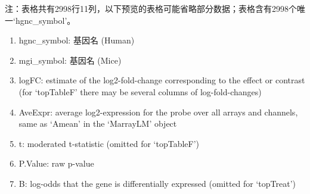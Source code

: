 \documentclass[
]{article}
\providecommand{\tightlist}{%
  \setlength{\itemsep}{0pt}\setlength{\parskip}{0pt}}
\begin{document}
\begin{center}\begin{tcolorbox}[colback=gray!10, colframe=gray!50, width=0.9\linewidth, arc=1mm, boxrule=0.5pt]注：表格共有2998行11列，以下预览的表格可能省略部分数据；表格含有2998个唯一`hgnc\_symbol'。
\end{tcolorbox}
\end{center}
\begin{center}\begin{tcolorbox}[colback=gray!10, colframe=gray!50, width=0.9\linewidth, arc=1mm, boxrule=0.5pt]\begin{enumerate}\tightlist
\item hgnc\_symbol:  基因名 (Human)
\item mgi\_symbol:  基因名 (Mice)
\item logFC:  estimate of the log2-fold-change corresponding to the effect or contrast (for ‘topTableF’ there may be several columns of log-fold-changes)
\item AveExpr:  average log2-expression for the probe over all arrays and channels, same as ‘Amean’ in the ‘MarrayLM’ object
\item t:  moderated t-statistic (omitted for ‘topTableF’)
\item P.Value:  raw p-value
\item B:  log-odds that the gene is differentially expressed (omitted for ‘topTreat’)
\end{enumerate}\end{tcolorbox}
\end{center}
\end{document}
